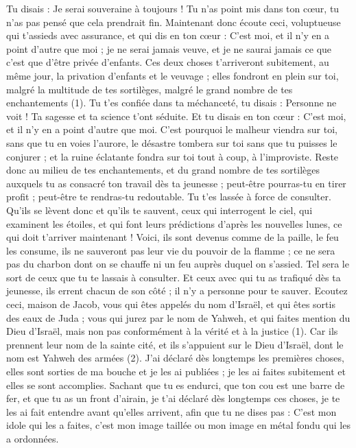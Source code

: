 \begin{multicols}{2}
{Tu disais : Je serai souveraine à toujours ! Tu n'as point mis dans ton cœur, tu n’as pas pensé que cela prendrait fin.
Maintenant donc écoute ceci, voluptueuse qui t’assieds avec assurance, et qui dis en ton cœur : C'est moi, et il n'y en a point d'autre que moi ; je ne serai jamais veuve, et je ne saurai jamais ce que c'est que d'être privée d'enfants.
Ces deux choses t'arriveront subitement, au même jour, la privation d'enfants et le veuvage ; elles fondront en plein sur toi, malgré la multitude de tes sortilèges, malgré le grand nombre de tes enchantements (1).
Tu t'es confiée dans ta méchanceté, tu disais : Personne ne voit ! Ta sagesse et ta science t’ont séduite. Et tu disais en ton cœur : C'est moi, et il n'y en a point d'autre que moi.
C'est pourquoi le malheur viendra sur toi, sans que tu en voies l’aurore, le désastre tombera sur toi sans que tu puisses le conjurer ; et la ruine éclatante fondra sur toi tout à coup, à l’improviste.
Reste donc au milieu de tes enchantements, et du grand nombre de tes sortilèges auxquels tu as consacré ton travail dès ta jeunesse ; peut-être pourras-tu en tirer profit ; peut-être te rendras-tu redoutable.
Tu t'es lassée à force de consulter. Qu’ils se lèvent donc et qu’ils te sauvent, ceux qui interrogent le ciel, qui examinent les étoiles, et qui font leurs prédictions d’après les nouvelles lunes, ce qui doit t’arriver maintenant !
Voici, ils sont devenus comme de la paille, le feu les consume, ils ne sauveront pas leur vie du pouvoir de la flamme ; ce ne sera pas du charbon dont on se chauffe ni un feu auprès duquel on s’assied.
Tel sera le sort de ceux que tu te lassais à consulter. Et ceux avec qui tu as trafiqué dès ta jeunesse, ils errent chacun de son côté ; il n'y a personne pour te sauver.
\VerseOne{}Ecoutez ceci, maison de Jacob, vous qui êtes appelés du nom d'Israël, et qui êtes sortis des eaux de Juda ; vous qui jurez par le nom de Yahweh, et qui faites mention du Dieu d'Israël, mais non pas conformément à la vérité et à la justice (1).
Car ils prennent leur nom de la sainte cité, et ils s'appuient sur le Dieu d'Israël, dont le nom est Yahweh des armées (2).
J'ai déclaré dès longtemps les premières choses, elles sont sorties de ma bouche et je les ai publiées ; je les ai faites subitement et elles se sont accomplies.
Sachant que tu es endurci, que ton cou est une barre de fer, et que tu as un front d'airain,
je t'ai déclaré dès longtemps ces choses, je te les ai fait entendre avant qu’elles arrivent, afin que tu ne dises pas : C’est mon idole qui les a faites, c’est mon image taillée ou mon image en métal fondu qui les a ordonnées.
}
\end{multicols}
